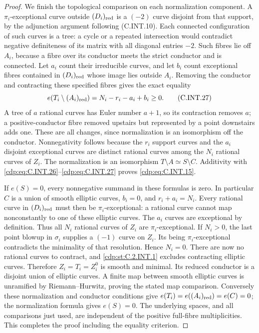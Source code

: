 \begin{proof}
We finish the topological comparison on each
normalization component. A $\pi_i$-exceptional
curve outside $(D_i)_{\rm red}$ is a $(-2)$ curve
disjoint from that support, by the adjunction
argument following (C.INT.10). Each connected
configuration of such curves is a tree: a cycle
or a repeated intersection would contradict
negative definiteness of its matrix with
all diagonal entries $-2$. Such fibres lie
off $A_i$, because a fibre over its conductor
meets the strict conductor and is connected.
Let $a_i$ count their irreducible curves, and
let $b_i$ count exceptional fibres contained
in $(D_i)_{\rm red}$ whose image lies outside
$A_i$. Removing the conductor and contracting
these specified fibres gives the exact equality
\[
 e(T_i\setminus(A_i)_{\rm red})
       =N_i-r_i-a_i+b_i\ge0.
 \tag{C.INT.27}\label{cdp:eq:C.INT.27}
\]
A tree of $a$ rational curves has Euler number
$a+1$, so its contraction removes $a$; a
positive-conductor fibre removed upstairs but
represented by a point downstairs adds one.
These are all changes, since normalization is
an isomorphism off the conductor. Nonnegativity
follows because the $r_i$ support curves and
the $a_i$ disjoint exceptional curves are
distinct rational curves among the $N_i$
rational curves of $Z_i$.
The normalization is an isomorphism
$T\setminus A\simeq S\setminus C$. Additivity
with \eqref{cdp:eq:C.INT.26}--\eqref{cdp:eq:C.INT.27} proves \eqref{cdp:eq:C.INT.15}.

If $e(S)=0$, every nonnegative summand in these
formulas is zero. In particular $C$ is a
union of smooth elliptic curves, $b_i=0$,
and $r_i+a_i=N_i$. Every rational curve in
$(D_i)_{\rm red}$ must then be $\pi_i$-exceptional:
a rational curve cannot map nonconstantly to
one of these elliptic curves. The $a_i$ curves
are exceptional by definition. Thus all $N_i$
rational curves of $Z_i$ are $\pi_i$-exceptional.
If $N_i>0$, the last point blowup in
$\sigma_i$ supplies a $(-1)$ curve on $Z_i$.
Its being $\pi_i$-exceptional contradicts the
minimality of that resolution. Hence $N_i=0$.
There are now no rational curves to contract,
and \ref{cdp:st:C.2.INT.1} excludes contracting elliptic
curves. Therefore $Z_i=T_i=Z_i^0$ is smooth
and minimal. Its reduced conductor is a
disjoint union of elliptic curves. A finite
map between smooth elliptic curves is
unramified by Riemann--Hurwitz, proving the
stated map comparison.
Conversely these normalization and conductor
conditions give $e(T_i)=e((A_i)_{\rm red})=e(C)=0$;
the normalization formula gives $e(S)=0$.
The underlying spaces, and all comparisons
just used, are independent of the positive
full-fibre multiplicities. This completes the
proof including the equality criterion.
\end{proof}


